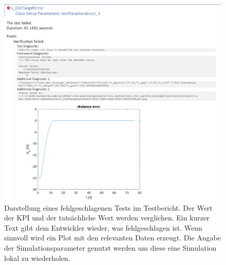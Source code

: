 \begin{figure}[ht]
    \centering
    \includegraphics[width=\textwidth]{figures/3_Implementierung/failed_test.png}
    \caption[Darstellung eines fehlgeschlagenen Tests im Testbericht]{Darstellung eines fehlgeschlagenen Tests im Testbericht. Der Wert der KPI und der tatsächliche Wert werden verglichen. Ein kurzer Text gibt dem Entwickler wieder, was fehlgeschlagen ist. Wenn sinnvoll wird ein Plot mit den relevanten Daten erzeugt. Die Angabe der Simulationsparameter genutzt werden um diese eine Simulation lokal zu wiederholen.}
    \label{fig:failed_test}
\end{figure}